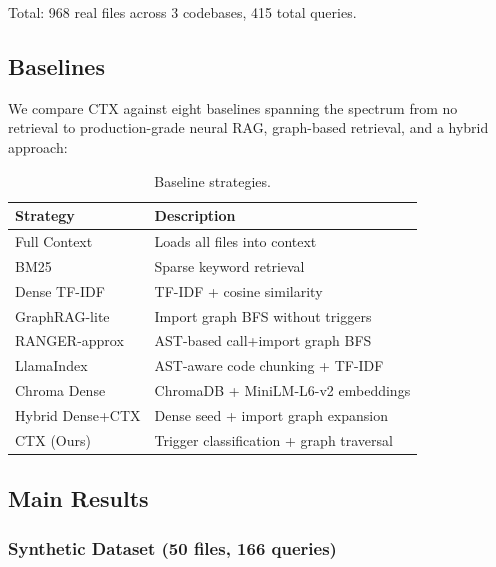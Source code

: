 \documentclass[11pt]{article}
\begin{document}
Total: 968 real files across 3 codebases, 415 total queries.

\subsection{Baselines}

We compare CTX against eight baselines spanning the spectrum from no retrieval to production-grade neural RAG, graph-based retrieval, and a hybrid approach:

\begin{table}[t]
\centering
\small
\caption{Baseline strategies.}
\label{tab:baselines}
\begin{tabular}{@{}lp{5.5cm}@{}}
\toprule
\textbf{Strategy} & \textbf{Description} \\
\midrule
Full Context & Loads all files into context \\
BM25 & Sparse keyword retrieval \\
Dense TF-IDF & TF-IDF + cosine similarity \\
GraphRAG-lite & Import graph BFS without triggers \\
RANGER-approx & AST-based call+import graph BFS \\
LlamaIndex & AST-aware code chunking + TF-IDF \\
Chroma Dense & ChromaDB + MiniLM-L6-v2 embeddings \\
Hybrid Dense+CTX & Dense seed + import graph expansion \\
CTX (Ours) & Trigger classification + graph traversal \\
\bottomrule
\end{tabular}
\end{table}

\subsection{Main Results}

\subsubsection{Synthetic Dataset (50 files, 166 queries)}
\end{document}
